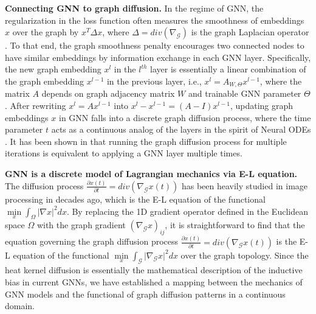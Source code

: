 \documentclass{article}
\begin{document}
\textbf{Connecting GNN to graph diffusion.} In the regime of GNN, the regularization in the loss function often measures the smoothness of embeddings $x$ over the graph by $x^T \Delta x$, where $\Delta=div(\nabla_{\mathcal{G}})$ is the graph Laplacian operator \cite{kipf2016semi}. To that end, the graph smoothness penalty encourages two connected nodes to have similar embeddings by information exchange in each GNN layer. Specifically, the new graph embedding $x^l$ in the $l^{th}$ layer is essentially a linear combination of the graph embedding $x^{l-1}$ in the previous layer, i.e., $x^l=A_{W, \Theta} x^{l-1}$, where the matrix $A$ depends on graph adjacency matrix $W$ and trainable GNN parameter $\Theta$. After rewriting $x^l=Ax^{l-1}$ into $x^l-x^{l-1}=(A-I)x^{l-1}$, updating graph embeddings $x$ in GNN falls into a discrete graph diffusion process, where the time parameter $t$ acts as a continuous analog of the layers in the spirit of Neural ODEs \cite{chen2018neural}. It has been shown in \cite{chamberlain2021grand} that running the graph diffusion process for multiple iterations is equivalent to applying a GNN layer multiple times.

\textbf{GNN is a discrete model of Lagrangian mechanics via E-L equation.}
The diffusion process $\frac{\partial x(t)}{\partial t}=div \left(\nabla_\mathcal{G} x(t)\right)$ has been heavily studied in image processing in decades ago, which is the E-L equation of the functional $\mathop {\min }\limits_x \int_\Omega  | \nabla x{|^2}dx$. By replacing the 1D gradient operator defined in the Euclidean space $\Omega$ with the graph gradient $(\nabla_\mathcal{G} x)_{ij}$, it is straightforward to find that the equation governing the graph diffusion process $\frac{\partial x(t)}{\partial t}=div \left(\nabla_\mathcal{G} x(t)\right)$ is the E-L equation of the functional $\mathop {\min }\limits_x \int_\mathcal{G}  | \nabla_{\mathcal{G}} x{|^2}dx$ over the graph topology. Since the heat kernel diffusion is essentially the mathematical description of the inductive bias in current GNNs, we have established a mapping between the mechanics of GNN models and the functional of graph diffusion patterns in a continuous domain.
\end{document}
